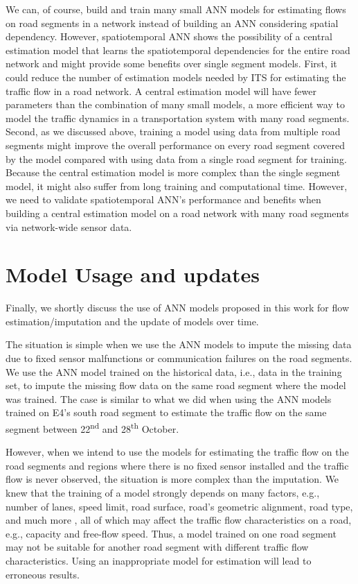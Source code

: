 \documentclass[english]{kththesis}
\begin{document}
We can, of course, build and train many small ANN models for estimating flows on road segments in a network instead of building an ANN considering spatial dependency. However, spatiotemporal ANN shows the possibility of a central estimation model that learns the spatiotemporal dependencies for the entire road network and might provide some benefits over single segment models. First, it could reduce the number of estimation models needed by ITS for estimating the traffic flow in a road network. A central estimation model will have fewer parameters than the combination of many small models, a more efficient way to model the traffic dynamics in a transportation system with many road segments. Second, as we discussed above, training a model using data from multiple road segments might improve the overall performance on every road segment covered by the model compared with using data from a single road segment for training. Because the central estimation model is more complex than the single segment model, it might also suffer from long training and computational time. However, we need to validate spatiotemporal ANN's performance and benefits when building a central estimation model on a road network with many road segments via network-wide sensor data.

\section{Model Usage and updates}
\label{sec:discussionModelUsage}

Finally, we shortly discuss the use of ANN models proposed in this work for flow estimation/imputation and the update of models over time. 

The situation is simple when we use the ANN models to impute the missing data due to fixed sensor malfunctions or communication failures on the road segments. We use the ANN model trained on the historical data, i.e., data in the training set, to impute the missing flow data on the same road segment where the model was trained. The case is similar to what we did when using the ANN models trained on  E4's south road segment to estimate the traffic flow on the same segment between 22\textsuperscript{nd} and 28\textsuperscript{th} October.

However, when we intend to use the models for estimating the traffic flow on the road segments and regions where there is no fixed sensor installed and the traffic flow is never observed, the situation is more complex than the imputation. We knew that the training of a model strongly depends on many factors, e.g., number of lanes, speed limit, road surface, road's geometric alignment, road type, and much more \cite{seo_tse, neumann_bayesian}, all of which may affect the traffic flow characteristics on a road, e.g., capacity and free-flow speed. Thus, a model trained on one road segment may not be suitable for another road segment with different traffic flow characteristics. Using an inappropriate model for estimation will lead to erroneous results.
\end{document}
